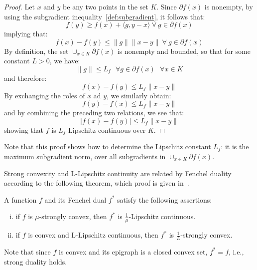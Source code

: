 
\begin{proof}
Let $x$ and $y$ be any two points in the set $K$. Since $\partial f(x)$ is nonempty, by using the subgradient inequality~\ref{def:subgradient}, it follows that:
$$
	f(y) \geq f(x) + \langle g, y - x \rangle \ \forall \ g \in \partial f(x)
$$
implying that:
$$
	f(x) - f(y) \leq \|g\| \|x-y\| \ \forall \ g \in \partial f(x)
$$
By definition, the set $\cup_{x \in K} \partial f(x)$ is nonempty and bounded, so that for some constant $L > 0$, we have:
$$
	\|g\| \leq L_f \ \ \ \forall g \in \partial f(x) \ \ \ \forall x \in K
$$
and therefore:
$$
	f(x) - f(y) \leq L_f \|x-y\|
$$
By exchanging the roles of $x$ ad $y$, we similarly obtain:
$$
	f(y) - f(x) \leq L_f \|x-y\|
$$
and by combining the preceding two relations, we see that:
$$
	|f(x) - f(y)| \leq L_f \|x-y\|
$$
showing that $f$ is $L_f$-Lipschitz continuous over $K$.
\end{proof}

Note that this proof shows how to determine the Lipschitz constant $L_f$: it is the maximum subgradient norm, over all subgradients in $\cup_{x \in K} \partial f(x)$.

Strong convexity and L-Lipschitz continuity are related by Fenchel duality according to the following theorem, which proof is given in~\cite{zhou2018fenchel}.


\begin{theorem}\label{def:strong_cvx_l_lipschitz_convex}
A function $f$ and its Fenchel dual $f^*$ satisfy the following assertions:
\begin{enumerate}[(i)]
		\item if $f$ is $\mu$-strongly convex, then $f^*$ is $\displaystyle \frac{1}{\mu}$-Lipschitz continuous.
		\item if $f$ is convex and L-Lipschitz continuous, then $f^*$ is $\displaystyle \frac{1}{L}$-strongly convex.
\end{enumerate}
\end{theorem}

Note that since $f$ is convex and its epigraph is a closed convex set, $f^* = f$, i.e., strong duality holds.

\pagebreak

